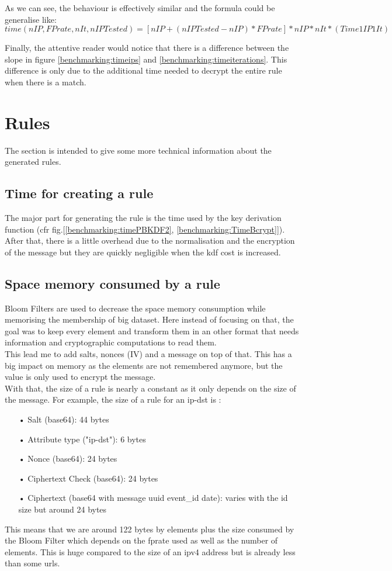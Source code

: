 \documentclass{eplmastersthesis}
\begin{document}
As we can see, the behaviour is effectively similar and the formula could be generalise like:
$$time(nIP, FPrate, nIt, nIPTested)=\left[nIP+(nIPTested-nIP)*FPrate\right]*nIP*nIt*(Time1IP1It)$$

Finally, the attentive reader would notice that there is a difference between the slope in figure \ref{benchmarking:timeips} and \ref{benchmarking:timeiterations}. This difference is only due to the additional time needed to decrypt the entire rule when there is a match.

\section{Rules}

The section is intended to give some more technical information about the generated rules.

\subsection{Time for creating a rule}
The major part for generating the rule is the time used by the key derivation function (cfr fig.[\ref{benchmarking:timePBKDF2}, \ref{benchmarking:TimeBcrypt}]). After that, there is a little overhead due to the normalisation and the encryption of the message but they are quickly negligible when the \gls{kdf} cost is increased.\\

\subsection{Space memory consumed by a rule}
Bloom Filters are used to decrease the space memory consumption while memorising the membership of big dataset. Here instead of focusing on that, the goal was to keep every element and transform them in an other format that needs information and cryptographic computations to read them.\\

This lead me to add salts, nonces (IV) and a message on top of that. This has a big impact on memory as the elements are not remembered anymore, but the value is only used to encrypt the message.\\

With that, the size of a rule is nearly a constant as it only depends on the size of the message. For example, the size of a rule for an ip-dst is :
\begin{itemize}
\item[•] Salt (base64): 44 bytes
\item[•] Attribute type ("ip-dst"): 6 bytes
\item[•] Nonce (base64): 24 bytes
\item[•] Ciphertext Check (base64): 24 bytes
\item[•] Ciphertext (base64 with message uuid event\_id date): varies with the id size but around 24 bytes
\end{itemize}
This means that we are around 122 bytes by elements plus the size consumed by the Bloom Filter which depends on the \gls{fp}rate used as well as the number of elements. This is huge compared to the size of an \gls{ipv4} address but is already less than some \gls{url}s.
\end{document}
